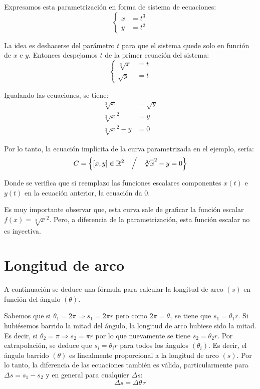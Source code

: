 Expresamos esta parametrización en forma de sistema de ecuaciones:
\[
\left\{
  \begin{aligned}
    x &= t^3
    \\
    y &= t^2
  \end{aligned}
\right.
\]

La idea es deshacerse del parámetro $t$ para que el sistema quede solo en función de $x$ e $y$.
Entonces despejamos $t$ de la primer ecuación del sistema:
\[
  \left\{
    \begin{aligned}
      \sqrt[3]{x} &= t
      \\
      \sqrt{y} &= t
    \end{aligned}
  \right.
\]

Igualando las ecuaciones, se tiene:
\begin{align*}
  \sqrt[3]{x} &= \sqrt{y}
  \\
  \sqrt[3]{x}^2 &= y
  \\
  \sqrt[3]{x}^2 - y &= 0
\end{align*}

Por lo tanto, la ecuación implícita de la curva parametrizada en el ejemplo, sería:
  \[ C = \left\{ [x,y] \in \mathbb{R}^2 \quad \Big/ \quad \sqrt[3]{x}^2 -y=0 \right\} \]

Donde se verifica que si reemplazo las funciones escalares componentes $x(t)$ e $y(t)$ en la ecuación anterior, la ecuación da 0.

Es muy importante observar que, esta curva sale de graficar la función escalar $f(x) = \sqrt[3]{x}^2$.
Pero, a diferencia de la parametrización, esta función escalar no es inyectiva.

\section{Longitud de arco}
\label{A:arcLength}

A continuación se deduce una fórmula para calcular la longitud de arco $(s)$ en función del ángulo $(\theta)$.

\begin{center}
    \def\svgwidth{0.4\linewidth}
    
\end{center}

Sabemos que si $\theta_1 = 2\pi \Rightarrow s_1 = 2 \pi r$ pero como $2 \pi = \theta_1$ se tiene que $s_1= \theta_1 r$.
Si hubiésemos barrido la mitad del ángulo, la longitud de arco hubiese sido la mitad.
Es decir, si $\theta_2 = \pi \Rightarrow s_2 = \pi r$ por lo que nuevamente se tiene $s_2= \theta_2 r$.
Por extrapolación, se deduce que $s_i = \theta_i r$ para todos los ángulos $(\theta_i)$.
Es decir, el ángulo barrido $(\theta)$ es linealmente proporcional a la longitud de arco $(s)$.
Por lo tanto, la diferencia de las ecuaciones también es válida, particularmente para $\Delta s = s_1-s_2$ y en general para cualquier $\Delta s$:
\[
  \Delta s = \Delta \theta \, r
\]

